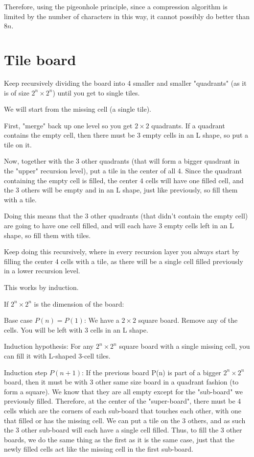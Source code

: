 \documentclass[11pt,letterpaper]{article}
\begin{document}
		Therefore, using the pigeonhole principle, since a compression algorithm is limited by the number of characters in this way, it cannot possibly do better than $8n$.
		
	\section{Tile board}
		Keep recursively dividing the board into 4 smaller and smaller "quadrants" (as it is of size $2^n \times 2^n$) until you get to single tiles.
		
		We will start from the missing cell (a single tile).
		
		First, "merge" back up one level so you get $2 \times 2$ quadrants.
		If a quadrant contains the empty cell, then there must be 3 empty cells in an L shape, so put a tile on it.
		
		Now, together with the 3 other quadrants (that will form a bigger quadrant in the "upper" recursion level), put a tile in the center of all 4.
		Since the quadrant containing the empty cell is filled, the center 4 cells will have one filled cell, and the 3 others will be empty and in an L shape, just like previously, so fill them with a tile.
		
		Doing this means that the 3 other quadrants (that didn't contain the empty cell) are going to have one cell filled, and will each have 3 empty cells left in an L shape, so fill them with tiles.
		
		Keep doing this recursively, where in every recursion layer you always start by filling the center 4 cells with a tile, as there will be a single cell filled previously in a lower recursion level.
		
		This works by induction.
		
		If $2^n \times 2^n$ is the dimension of the board:
		
		Base case $P(n)=P(1)$: We have a $2 \times 2$ square board. Remove any of the cells. You will be left with 3 cells in an L shape.
		
		Induction hypothesis: For any $2^n \times 2^n$ square board with a single missing cell, you can fill it with L-shaped 3-cell tiles.
		
		Induction step $P(n+1)$: If the previous board P(n) is part of a bigger $2^n \times 2^n$ board, then it must be with 3 other same size board in a quadrant fashion (to form a square). We know that they are all empty except for the "sub-board" we previously filled. Therefore, at the center of the "super-board", there must be 4 cells which are the corners of each sub-board that touches each other, with one that filled or has the missing cell. We can put a tile on the 3 others, and as such the 3 other sub-board will each have a single cell filled. Thus, to fill the 3 other boards, we do the same thing as the first as it is the same case, just that the newly filled cells act like the missing cell in the first sub-board.
	
\end{document}
